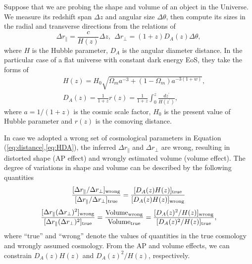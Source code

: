 \documentclass[iop]{emulateapj}
\begin{document}
Suppose that we are probing the shape and volume of an object in the Universe.
We measure its redshift span $\Delta z$ and angular size $\Delta \theta$,
then compute its sizes in the radial and transverse directions from the relations of 
\begin{equation}\label{eq:distance}
\Delta r_{\parallel} = \frac{c}{H(z)}\Delta z,\ \ \Delta r_{\bot}=(1+z)D_A(z)\Delta \theta,
\end{equation}
where $H$ is the Hubble parameter, $D_A$ is the angular diameter distance.
In the particular case of a flat universe with constant dark energy EoS, they take the forms of
\begin{eqnarray}\label{eq:HDA}
& &H(z) = H_0\sqrt{\Omega_ma^{-3}+(1-\Omega_m)a^{-3(1+w)}},\nonumber\\
& &D_A(z) = \frac{1}{1+z}r(z)=\frac{1}{1+z}\int_0^z \frac{dz^\prime}{H(z^\prime)},
\end{eqnarray}
where $a=1/(1+z)$ is the cosmic scale factor,
$H_0$ is the present value of Hubble parameter and $r(z)$ is the comoving distance.

In case we adopted a wrong set of cosmological parameters in Equation (\ref{eq:distance},\ref{eq:HDA}),
the inferred $\Delta r_{\parallel}$ and $\Delta r_{\bot}$ are wrong,
resulting in distorted shape (AP effect) and wrongly estimated volume (volume effect).
The degree of variations in shape and volume can be described by the following quantities
\begin{equation}\label{eq:stretch}
 \frac{[\Delta r_{\parallel}/\Delta r_{\perp}]_{\rm wrong}}{[\Delta r_{\parallel}/\Delta r_{\perp}]_{\rm true}} =
  \frac{[D_A(z)H(z)]_{\rm true}}{[D_A(z)H(z)]_{\rm wrong}} 
\end{equation}
\begin{equation}\label{eq:volume}
 \frac{[\Delta r_{\parallel}(\Delta r_{\perp})^{2}]_{\rm wrong}}{[\Delta r_{\parallel}(\Delta r_{\perp})^{2}]_{\rm true}}
 = \frac{{\rm Volume}_{\rm wrong}}{{\rm Volume}_{\rm true}}
 = \frac{[D_A(z)^2/H(z)]_{\rm wrong}}{[D_A(z)^2 / H(z)]_{\rm true}},
\end{equation}
where ``true'' and ``wrong'' denote the values of quantities in the true cosmology and wrongly assumed cosmology.
From the AP and volume effects, we can constrain  $D_A(z)H(z)$ and $D_A(z)^2 / H(z)$, respectively.
\end{document}
